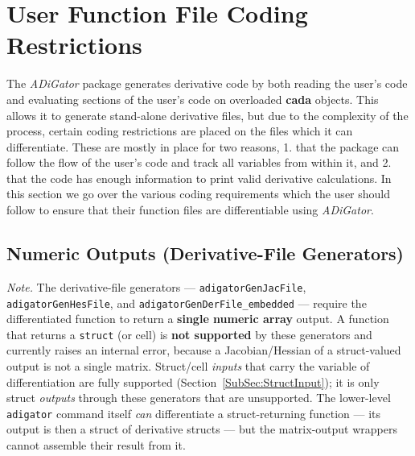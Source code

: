 \documentclass[10pt,pdftex]{article}
\begin{document}
\section{User Function File Coding Restrictions}\label{Sec:Restrictions}
The \emph{ADiGator} package generates derivative code by both reading the user's code and evaluating sections of the user's code on overloaded {\bf cada} objects. This allows it to generate stand-alone derivative files, but due to the complexity of the process, certain coding restrictions are placed on the files which it can differentiate. These are mostly in place for two reasons, 1. that the package can follow the flow of the user's code and track all variables from within it, and 2. that the code has enough information to print valid derivative calculations. In this section we go over the various coding requirements which the user should follow to ensure that their function files are differentiable using \emph{ADiGator}.
\subsection{Numeric Outputs (Derivative-File Generators)}\label{SubSec:NumericOutput}
\emph{Note.} The derivative-file generators --- \texttt{adigatorGenJacFile}, \texttt{adigatorGenHesFile}, and \texttt{adigatorGenDerFile\_embedded} --- require the differentiated function to return a \textbf{single numeric array} output. A function that returns a \texttt{struct} (or cell) is \textbf{not supported} by these generators and currently raises an internal error, because a Jacobian/Hessian of a struct-valued output is not a single matrix. Struct/cell \emph{inputs} that carry the variable of differentiation are fully supported (Section~\ref{SubSec:StructInput}); it is only struct \emph{outputs} through these generators that are unsupported. The lower-level \texttt{adigator} command itself \emph{can} differentiate a struct-returning function --- its output is then a struct of derivative structs --- but the matrix-output wrappers cannot assemble their result from it.
\end{document}
